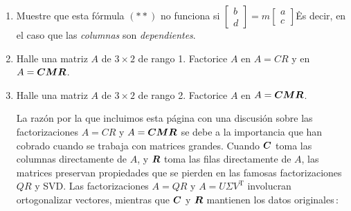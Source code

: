 \documentclass[12pt,a4paper]{article}
\newcommand{\bi}[1]{\hbox{\boldmath$#1$}}
\newcommand\1{\mbox{\,\vrule height-0.8pt depth1.0pt width2pc\,}}
\newcommand\2{\mbox{\,\vrule height-0.8pt depth1.0pt width1pc\,}}
\DeclareRobustCommand\transp{^{\mathrm{T}}}
\begin{document}
\begin{enumerate}
\item Muestre que esta fórmula $(**)$ no funciona si $\left[\begin{array}{r}
b\\
d
\end{array}\right] =m \left[\begin{array}{r}
a\\
c
\end{array}\right]$\. Es decir, en el caso que las \emph{columnas} son \emph{dependientes}.

\item Halle una matriz $A$ de $3 \times 2$ de rango 1. Factorice $A$ en $A=CR$ y en $A=\bi{C}\bi{M}\bi{R}$.\linebreak\vspace{-6pt}

\item Halle una matriz $A$ de $3 \times 2$ de rango 2. Factorice $A$ en $A=\bi{C}\bi{M}\bi{R}$.

\vspace{5pt}
\hspace{10pt}
La razón por la que incluimos esta página con una discusión sobre las factorizaciones $A=CR$ y $A=\bi{C}\bi{M}\bi{R}$ se debe a la importancia que han cobrado cuando se trabaja con matrices grandes. Cuando $\bi{C}$ toma las columnas directamente de $A$, y $\bi{R}$ toma las filas directamente de $A$, las matrices preservan propiedades que se pierden en las famosas factorizaciones $QR$ y SVD. Las factorizaciones $A=QR$ y $A= U\Sigma V^{\mathrm{T}}$ involucran ortogonalizar vectores, mientras que $\bi{C}$ y $\bi{R}$ mantienen los datos originales\,:


\end{enumerate}
\end{document}
